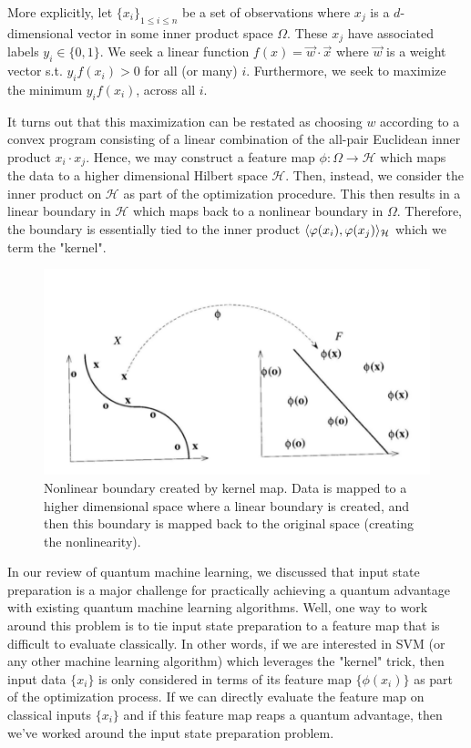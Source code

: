 \documentclass[main.tex]{subfiles}
\begin{document}
More explicitly, let $\{ x_i \}_{1 \leq i \leq n}$ be a set of observations where $x_j$ is a $d$-dimensional vector in some inner product space $\Omega$. These $x_j$ have associated labels $y_i \in \{ 0 , 1\}$. We seek a linear function $f(x) = \vec{w} \cdot \vec{x}$ where $\vec{w}$ is a weight vector s.t. $y_if(x_i) > 0$ for all (or many) $i$. Furthermore, we seek to maximize the minimum $y_i f(x_i)$, across all $i$.

It turns out that this maximization can be restated as choosing $w$ according to a convex program consisting of a linear combination of the all-pair Euclidean inner product $x_i \cdot x_j$. Hence, we may construct a feature map $\phi : \Omega \rightarrow \mathcal{H}$ which maps the data to a higher dimensional Hilbert space $\mathcal{H}$. Then, instead, we consider the inner product on $\mathcal{H}$ as part of the optimization procedure. This then results in a linear boundary in $\mathcal{H}$ which maps back to a nonlinear boundary in $\Omega$. Therefore, the boundary is essentially tied to the inner product $\langle \varphi (x_i), \varphi(x_j) \rangle _{\mathcal{H}}$ which we term the "kernel".

\begin{figure}
\centering
\includegraphics[width= 0.7\linewidth]{images/kernel}
\caption{Nonlinear boundary created by kernel map. Data is mapped to a higher dimensional space where a linear boundary is created, and then this boundary is mapped back to the original space (creating the nonlinearity).}
\end{figure}


In our review of quantum machine learning, we discussed that input state preparation is a major challenge for practically achieving a quantum advantage with existing quantum machine learning algorithms. Well, one way to work around this problem is to tie input state preparation to a feature map that is difficult to evaluate classically. In other words, if we are interested in SVM (or any other machine learning algorithm) which leverages the "kernel" trick, then input data $\{ x_i \}$ is only considered in terms of its feature map $\{ \phi(x_i) \}$ as part of the optimization process. If we can directly evaluate the feature map on classical inputs $\{ x_i \}$ and if this feature map reaps a quantum advantage, then we've worked around the input state preparation problem.
\end{document}
